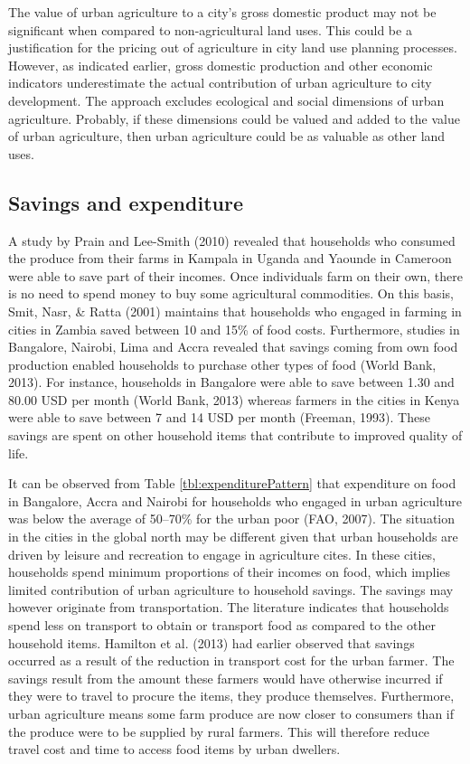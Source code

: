 The value of urban agriculture to a city's gross domestic product may not be significant when compared to non-agricultural land uses. This could be a justification for the pricing out of agriculture in city land use planning processes. However, as indicated earlier, gross domestic production and other economic indicators underestimate the actual contribution of urban agriculture to city development. The approach excludes ecological and social dimensions of urban agriculture. Probably, if these dimensions could be valued and added to the value of urban agriculture, then urban agriculture could be as valuable as other land uses.

\subsection{Savings and expenditure}

A study by Prain and Lee-Smith (2010) revealed that households who consumed the produce from their farms in Kampala in Uganda and Yaounde in Cameroon were able to save part of their incomes. Once individuals farm on their own, there is no need to spend money to buy some agricultural commodities. On this basis, Smit, Nasr, \& Ratta (2001) maintains that households who engaged in farming in cities in Zambia saved between 10 and 15\% of food costs. Furthermore, studies in Bangalore, Nairobi, Lima and Accra revealed that savings coming from own food production enabled households to purchase other types of food (World Bank, 2013). For instance, households in Bangalore were able to save between 1.30 and 80.00 USD per month (World Bank, 2013) whereas farmers in the cities in Kenya were able to save between 7 and 14 USD per month (Freeman, 1993). These savings are spent on other household items that contribute to improved quality of life.

It can be observed from Table \ref{tbl:expenditurePattern} that expenditure on food in Bangalore, Accra and Nairobi for households who engaged in urban agriculture was below the average of 50–70\% for the urban poor (FAO, 2007). The situation in the cities in the global north may be different given that urban households are driven by leisure and recreation to engage in agriculture cites. In these cities, households spend minimum proportions of their incomes on food, which implies limited contribution of urban agriculture to household savings. The savings may however originate from transportation. The literature indicates that households spend less on transport to obtain or transport food as compared to the other household items. Hamilton et al. (2013) had earlier observed that savings occurred as a result of the reduction in transport cost for the urban farmer. The savings result from the amount these farmers would have otherwise incurred if they were to travel to procure the items, they produce themselves. Furthermore, urban agriculture means some farm produce are now closer to consumers than if the produce were to be supplied by rural farmers. This will therefore reduce travel cost and time to access food items by urban dwellers.

